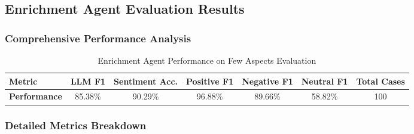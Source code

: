 \subsection{Enrichment Agent Evaluation Results}

\subsubsection{Comprehensive Performance Analysis}

\begin{table}[h]
\centering
\caption{Enrichment Agent Performance on Few Aspects Evaluation}
\label{tab:evaluation_results}
\begin{tabular}{lcccccc}
\toprule
\textbf{Metric} & \textbf{LLM F1} & \textbf{Sentiment Acc.} & \textbf{Positive F1} & \textbf{Negative F1} & \textbf{Neutral F1} & \textbf{Total Cases} \\
\midrule
\textbf{Performance} & 85.38\% & 90.29\% & 96.88\% & 89.66\% & 58.82\% & 100 \\
\bottomrule
\end{tabular}
\end{table}

\subsubsection{Detailed Metrics Breakdown}

